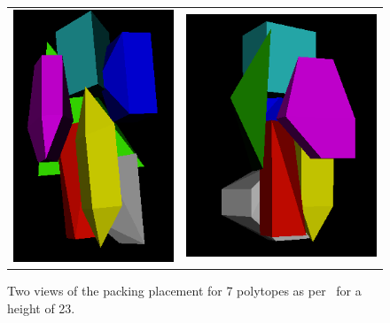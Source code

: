\begin{figure}
\begin{center}
\begin{tabular}{cc}
\begin{minipage}{.4\textwidth}
\includegraphics[scale=.5]{problem_7_1.png}
\end{minipage}
&
\begin{minipage}{.4\textwidth}
\includegraphics[scale=.5]{problem_7_2.png}
\end{minipage}
\end{tabular}
\end{center}
\caption{Two views of the packing placement for 7 polytopes as per~\cite{sto03} 
for a height of 23.}
\label{fig:p7}
\end{figure}
